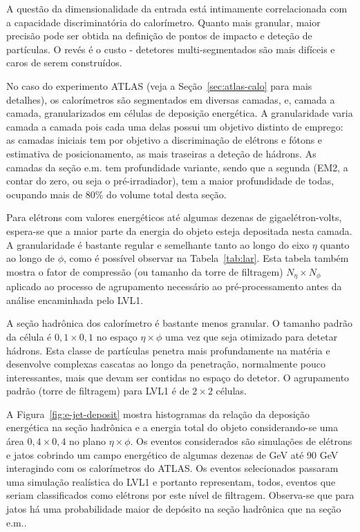 A questão da dimensionalidade da entrada está intimamente correlacionada com a
capacidade discriminatória do calorímetro. Quanto mais granular, maior precisão
pode ser obtida na definição de pontos de impacto e deteção de partículas. O
revés é o custo - detetores multi-segmentados são mais difíceis e caros de
serem construídos.

No caso do experimento ATLAS (veja a Seção~\ref{sec:atlas-calo} para mais
detalhes), os calorímetros são segmentados em diversas camadas, e, camada a
camada, granularizados em células de deposição energética. A granularidade
varia camada a camada pois cada uma delas possui um objetivo distinto de
emprego: as camadas iniciais tem por objetivo a discriminação de elétrons e
fótons e estimativa de posicionamento, as mais traseiras a deteção de
hádrons. As camadas da seção e.m. tem profundidade variante, sendo que a
segunda (EM2, a contar do zero, ou seja o pré-irradiador), tem a maior
profundidade de todas, ocupando mais de 80\% do volume total desta seção.

Para elétrons com valores energéticos até algumas dezenas de
gigaelétron-volts, espera-se que a maior parte da energia do objeto esteja
depositada nesta camada. A granularidade é bastante regular e semelhante tanto
ao longo do eixo $\eta$ quanto ao longo de $\phi$, como é possível observar na
Tabela~\ref{tab:lar}. Esta tabela também mostra o fator de compressão (ou
tamanho da torre de filtragem) $N_{\eta} \times N_{\phi}$ aplicado ao processo
de agrupamento necessário ao pré-processamento antes da análise encaminhada
pelo LVL1.

A seção hadrônica dos calorímetro é bastante menos granular. O tamanho padrão
da célula é $0,1\times0,1$ no espaço $\eta\times\phi$ uma vez que seja
otimizado para detetar hádrons. Esta classe de partículas penetra mais
profundamente na matéria e desenvolve complexas cascatas ao longo da
penetração, normalmente pouco interessantes, mais que devam ser contidas no
espaço do detetor. O agrupamento padrão (torre de filtragem) para LVL1 é de
$2\times2$ células.

A Figura~\ref{fig:e-jet-deposit} mostra histogramas da relação da deposição
energética na seção hadrônica e a energia total do objeto considerando-se uma
área $0,4\times0,4$ no plano $\eta\times\phi$. Os eventos considerados são
simulações de elétrons e jatos cobrindo um campo energético de algumas dezenas
de GeV até 90 GeV interagindo com os calorímetros do ATLAS. Os eventos
selecionados passaram uma simulação realística do LVL1 e portanto representam,
todos, eventos que seriam classificados como elétrons por este nível de
filtragem. Observa-se que para jatos há uma probabilidade maior de depósito na
seção hadrônica que na seção e.m..

